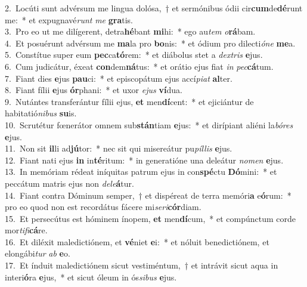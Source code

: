 {2.~}Locúti sunt advérsum me lingua dolósa,~† et sermónibus ódii cir\textbf{cum}de\textbf{dé}runt me:~* et expugnavé\textit{runt} \textit{me} \textbf{gra}tis.\\
{3.~}Pro eo ut me dilígerent, detra\textbf{hé}bant \textbf{mi}hi:~* ego au\textit{tem} \textit{o}\textbf{rá}bam.\\
{4.~}Et posuérunt advérsum me \textbf{ma}la pro \textbf{bo}nis:~* et ódium pro dilecti\textit{ó}\textit{ne} \textbf{me}a.\\
{5.~}Constítue super eum \textbf{pec}ca\textbf{tó}rem:~* et diábolus stet a \textit{dex}\textit{tris} \textbf{e}jus.\\
{6.~}Cum judicátur, éxeat \textbf{con}dem\textbf{ná}tus:~* et orátio ejus fiat \textit{in} \textit{pec}\textbf{cá}tum.\\
{7.~}Fiant dies \textbf{e}jus \textbf{pau}ci:~* et episcopátum ejus accí\textit{pi}\textit{at} \textbf{al}ter.\\
{8.~}Fiant fílii \textbf{e}jus \textbf{ór}phani:~* et uxor \textit{e}\textit{jus} \textbf{ví}dua.\\
{9.~}Nutántes transferántur fílii ejus, \textbf{et} men\textbf{dí}cent:~* et ejiciántur de habitatió\textit{ni}\textit{bus} \textbf{su}is.\\
{10.~}Scrutétur fœnerátor omnem sub\textbf{stán}tiam \textbf{e}jus:~* et dirípiant aliéni la\textit{bó}\textit{res} \textbf{e}jus.\\
{11.~}Non sit \textbf{il}li ad\textbf{jú}tor:~* nec sit qui misereátur pu\textit{píl}\textit{lis} \textbf{e}jus.\\
{12.~}Fiant nati ejus \textbf{in} in\textbf{té}ritum:~* in generatióne una deleátur \textit{no}\textit{men} \textbf{e}jus.\\
{13.~}In memóriam rédeat iníquitas patrum ejus in con\textbf{spé}ctu \textbf{Dó}mini:~* et peccátum matris ejus non \textit{de}\textit{le}\textbf{á}tur.\\
{14.~}Fiant contra Dóminum semper,~† et dispéreat de terra memóri\textbf{a} e\textbf{ó}rum:~* pro eo quod non est recordátus fácere mi\textit{se}\textit{ri}\textbf{cór}diam.\\
{15.~}Et persecútus est hóminem ínopem, \textbf{et} men\textbf{dí}cum,~* et compúnctum corde mor\textit{ti}\textit{fi}\textbf{cá}re.\\
{16.~}Et diléxit maledictiónem, et \textbf{vé}niet \textbf{e}i:~* et nóluit benedictiónem, et elongábi\textit{tur} \textit{ab} \textbf{e}o.\\
{17.~}Et índuit maledictiónem sicut vestiméntum,~† et intrávit sicut aqua in interi\textbf{ó}ra \textbf{e}jus,~* et sicut óleum in ós\textit{si}\textit{bus} \textbf{e}jus.\\
